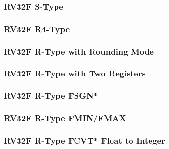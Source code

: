 \subsubsection[{\small RV32F S-Type}]{RV32F S-Type} \label{sec:format-RV32F-SType}



\subsubsection[{\small RV32F R4-Type}]{RV32F R4-Type} \label{sec:format-RV32F-R4TypeRM}



\subsubsection[{\small RV32F R-Type with Rounding Mode}]{RV32F R-Type with Rounding Mode} \label{sec:format-RV32F-R3TypeRM}



\subsubsection[{\small RV32F R-Type with Two Registers}]{RV32F R-Type with Two Registers} \label{sec:format-RV32F-R2TypeRM}



\subsubsection[{\small RV32F R-Type FSGN*}]{RV32F R-Type FSGN*} \label{sec:format-RV32F-RTypeFSGN}



\subsubsection[{\small RV32F R-Type FMIN/FMAX}]{RV32F R-Type FMIN/FMAX} \label{sec:format-RV32F-RTypeFMIN}



\subsubsection[{\small RV32F R-Type FCVT* Float to Integer}]{RV32F R-Type FCVT* Float to Integer} \label{sec:format-RV32F-RTypeFCF2I}

